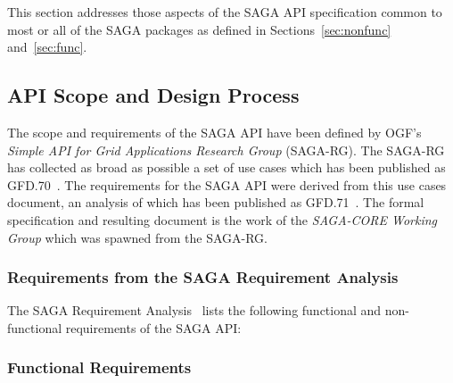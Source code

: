 
 This section addresses those aspects of the SAGA API specification
 common to most or all of the SAGA packages as defined in
 Sections~\ref{sec:nonfunc} and~\ref{sec:func}.

  \subsection{API Scope and Design Process}
  
  The scope and requirements of the SAGA API have been defined by
  OGF's \emph{Simple API for Grid Applications Research Group}
  (SAGA-RG).  The SAGA-RG has collected as broad as possible a set of
  use cases which has been published as GFD.70~\cite{saga-uc}.
 The requirements for the SAGA API were
    derived from this use cases document, an analysis of which has
    been published as GFD.71~\cite{saga-req}.  The formal specification and
    resulting document is the work of the \emph{SAGA-CORE Working
      Group} which was spawned from the SAGA-RG.

  \subsubsection{Requirements from the SAGA Requirement
  Analysis}
  
 The SAGA Requirement Analysis~\cite{saga-req} lists the following
 functional and non-functional requirements of the SAGA API:

  \subsubsection*{Functional Requirements}

